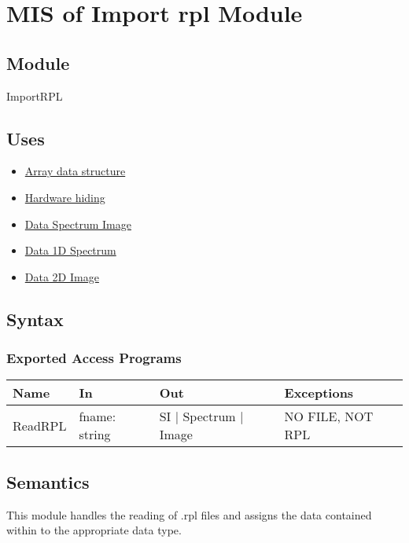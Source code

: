 \documentclass[12pt, titlepage]{article}
\begin{document}
\section{MIS of Import rpl Module} \label{Mod:ImportRPL}

\subsection{Module}

ImportRPL

\subsection{Uses}
\begin{itemize}
    \item \hyperref[Mod:Array]{Array data structure}
    \item \hyperref[Mod:HH]{Hardware hiding}
    \item \hyperref[Mod:SI]{Data Spectrum Image}
    \item \hyperref[Mod:Spectrum]{Data 1D Spectrum}
    \item \hyperref[Mod:Image]{Data 2D Image}
\end{itemize}

\subsection{Syntax}

\subsubsection{Exported Access Programs}

\begin{center}
    \begin{tabular}{p{2cm} p{4cm} p{4cm} p{2cm}}
        \hline
        \textbf{Name} & \textbf{In} & \textbf{Out} & \textbf{Exceptions} \\
        \hline
        ReadRPL & fname: string & SI $|$ Spectrum $|$ Image & NO FILE, NOT RPL \\
        \hline
    \end{tabular}
\end{center}

\subsection{Semantics}
This module handles the reading of .rpl files and assigns the data contained
within to the appropriate data type.
\end{document}
